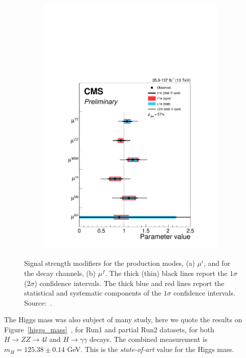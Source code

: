 \begin{figure}[htbp]
\begin{subfigure}[htbp]{0.48\textwidth}
    \includegraphics[width=\textwidth]{figures_and_tables/theory/signal_strength_modifier_decay.pdf}
    \caption{ }
    \label{signal_strength_modifier_decay}
  \end{subfigure}
  \caption{Signal strength modifiers for the production modes, (a) $\mu^{i}$, and for the decay channels, (b) $\mu^{f}$. The thick (thin) black lines report the $1\sigma$ ($2\sigma$) confidence intervals. The thick blue and red lines report the statistical and systematic components of the $1\sigma$ confidence intervals. Source:~\cite{cms_higgs_comb_run2}.}
  \label{signal_strength_modifier}
\end{figure}

The Higgs mass was also subject of many study, here we quote the results on Figure~\ref{higgs_mass}~\cite{Sirunyan:2020xwk}, for Run1 and partial Run2 datasets, for both $H \rightarrow ZZ \rightarrow 4l$ and $H \rightarrow \gamma\gamma$ decays. The combined measurement is $m_H = 125.38 \pm 0.14$ GeV. This is the \textit{state-of-art} value for the Higgs mass.


